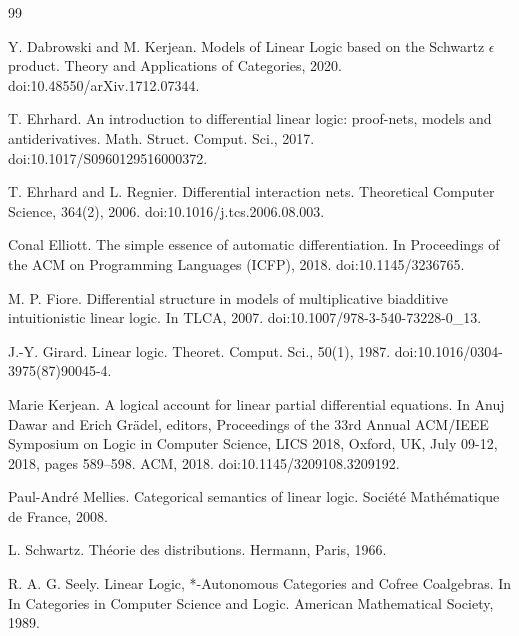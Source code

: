 \documentclass[10pt,a4paper]{article}
\begin{document}
\begin{thebibliography}{99}
\par\noindent    Y. Dabrowski and M. Kerjean.  Models of Linear Logic based on the Schwartz $\epsilon$ product.  Theory and Applications of Categories, 2020.  doi:10.48550/arXiv.1712.07344.  

\par\noindent    T. Ehrhard.  An introduction to differential linear logic: proof-nets, models and antiderivatives.  Math. Struct. Comput. Sci., 2017.  doi:10.1017/S0960129516000372.  

\par\noindent    T. Ehrhard and L. Regnier.  Differential interaction nets.  Theoretical Computer Science, 364(2), 2006.  doi:10.1016/j.tcs.2006.08.003.  

\par\noindent    Conal Elliott.  The simple essence of automatic differentiation.  In Proceedings of the ACM on Programming Languages (ICFP), 2018.  doi:10.1145/3236765.  

\par\noindent    M. P. Fiore.  Differential structure in models of multiplicative biadditive intuitionistic linear logic.  In TLCA, 2007.  doi:10.1007/978-3-540-73228-0\_13.  

\par\noindent    J.-Y. Girard.  Linear logic.  Theoret. Comput. Sci., 50(1), 1987.  doi:10.1016/0304-3975(87)90045-4.  

\par\noindent    Marie Kerjean.  A logical account for linear partial differential equations.  In Anuj Dawar and Erich Grädel, editors, Proceedings of the 33rd Annual ACM/IEEE Symposium on Logic in Computer Science, LICS 2018, Oxford, UK, July 09-12, 2018, pages 589–598. ACM, 2018.  doi:10.1145/3209108.3209192.  

\par\noindent    Paul-André Mellies.  Categorical semantics of linear logic.  Société Mathématique de France, 2008.  

\par\noindent    L. Schwartz.  Théorie des distributions.  Hermann, Paris, 1966.  

\par\noindent    R. A. G. Seely.  Linear Logic, *-Autonomous Categories and Cofree Coalgebras.  In In Categories in Computer Science and Logic. American Mathematical Society, 1989.  

\end{thebibliography}
\end{document}
